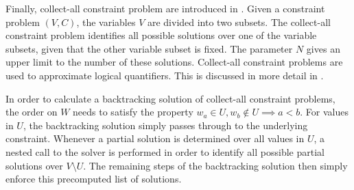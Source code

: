     Finally, collect-all constraint problem are introduced in
    .
    Given a constraint problem $(V,C)$, the variables $V$ are divided into
    two subsets.
    The collect-all constraint problem identifies all possible solutions over
    one of the variable subsets, given that the other variable subset is fixed.
    The parameter $N$ gives an upper limit to the number of these solutions.
    Collect-all constraint problems are used to approximate logical quantifiers.
    This is discussed in more detail in .

    In order to calculate a backtracking solution of collect-all constraint
    problems, the order on $W$ needs to satisfy the property
    $w_a\in U,w_b\notin U\implies a<b$.
    For values in $U$, the backtracking solution simply passes through to the
    underlying constraint.
    Whenever a partial solution is determined over all values in $U$, a nested
    call to the solver is performed in order to identify all possible partial
    solutions over $V\setminus U$.
    The remaining steps of the backtracking solution then simply enforce this
    precomputed list of solutions.



